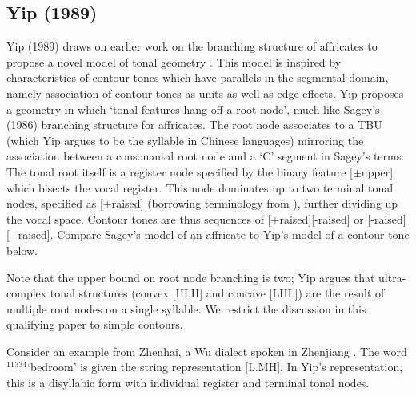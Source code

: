 \documentclass{article}
\begin{document}
\subsection{Yip (1989)}
Yip (1989) draws on earlier work on the branching structure of affricates to propose a novel model of tonal geometry \citep{Yip1989, Clements1985, Sagey1986}. This model is inspired by characteristics of contour tones which have parallels in the segmental domain, namely association of contour tones as units as well as edge effects. Yip proposes a geometry in which `tonal features hang off a root node', much like Sagey's (1986) branching structure for affricates. The root node associates to a TBU (which Yip argues to be the syllable in Chinese languages) mirroring the association between a consonantal root node and a `C' segment in Sagey's terms. The tonal root itself is a register node specified by the binary feature [$\pm$upper] which bisects the vocal register. This node dominates up to two terminal tonal nodes, specified as [$\pm$raised] (borrowing terminology from \citet{Pulleyblank1986}), further dividing up the vocal space. Contour tones are thus sequences of [+raised][-raised] or [-raised][+raised]. Compare Sagey's model of an affricate to Yip's model of a contour tone below.
\begin{center}
\hspace{1cm}
\end{center}
Note that the upper bound on root node branching is two; Yip argues that ultra-complex tonal structures (convex [HLH] and concave [LHL]) are the result of multiple root nodes on a single syllable. We restrict the discussion in this qualifying paper to simple contours. \par
Consider an example from Zhenhai, a Wu dialect spoken in Zhenjiang \citep{Chen2000, Rose1990}. The word $^{11}$$^{334}$`bedroom' is given the string representation [L.MH]. In Yip's representation, this is a disyllabic form with individual register and terminal tonal nodes.
\end{document}
